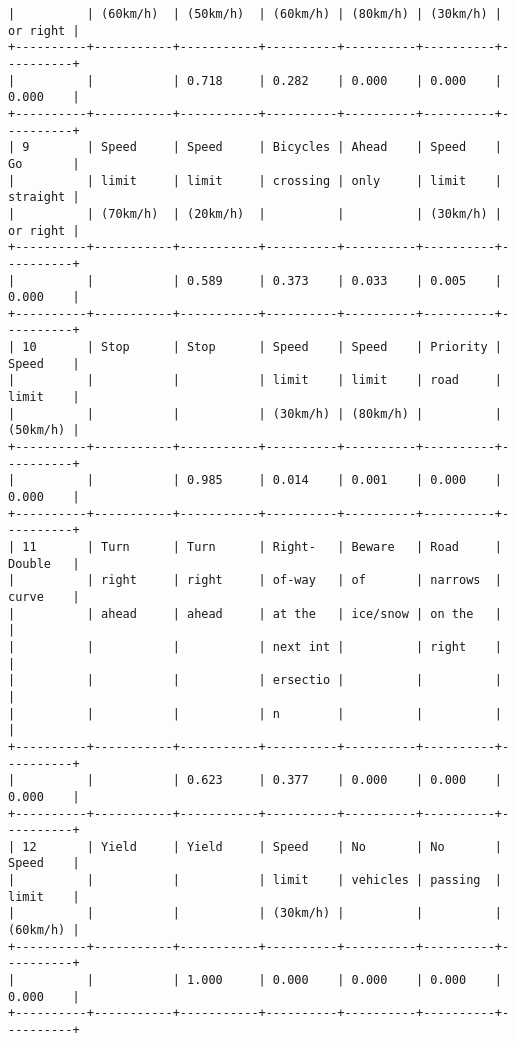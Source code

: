 \documentclass[11pt]{article}
\begin{document}
\begin{Verbatim}[commandchars=\\\{\}]
|          | (60km/h)  | (50km/h)  | (60km/h) | (80km/h) | (30km/h) | or right |
+----------+-----------+-----------+----------+----------+----------+----------+
|          |           | 0.718     | 0.282    | 0.000    | 0.000    | 0.000    |
+----------+-----------+-----------+----------+----------+----------+----------+
| 9        | Speed     | Speed     | Bicycles | Ahead    | Speed    | Go       |
|          | limit     | limit     | crossing | only     | limit    | straight |
|          | (70km/h)  | (20km/h)  |          |          | (30km/h) | or right |
+----------+-----------+-----------+----------+----------+----------+----------+
|          |           | 0.589     | 0.373    | 0.033    | 0.005    | 0.000    |
+----------+-----------+-----------+----------+----------+----------+----------+
| 10       | Stop      | Stop      | Speed    | Speed    | Priority | Speed    |
|          |           |           | limit    | limit    | road     | limit    |
|          |           |           | (30km/h) | (80km/h) |          | (50km/h) |
+----------+-----------+-----------+----------+----------+----------+----------+
|          |           | 0.985     | 0.014    | 0.001    | 0.000    | 0.000    |
+----------+-----------+-----------+----------+----------+----------+----------+
| 11       | Turn      | Turn      | Right-   | Beware   | Road     | Double   |
|          | right     | right     | of-way   | of       | narrows  | curve    |
|          | ahead     | ahead     | at the   | ice/snow | on the   |          |
|          |           |           | next int |          | right    |          |
|          |           |           | ersectio |          |          |          |
|          |           |           | n        |          |          |          |
+----------+-----------+-----------+----------+----------+----------+----------+
|          |           | 0.623     | 0.377    | 0.000    | 0.000    | 0.000    |
+----------+-----------+-----------+----------+----------+----------+----------+
| 12       | Yield     | Yield     | Speed    | No       | No       | Speed    |
|          |           |           | limit    | vehicles | passing  | limit    |
|          |           |           | (30km/h) |          |          | (60km/h) |
+----------+-----------+-----------+----------+----------+----------+----------+
|          |           | 1.000     | 0.000    | 0.000    | 0.000    | 0.000    |
+----------+-----------+-----------+----------+----------+----------+----------+

    \end{Verbatim}
\end{document}
